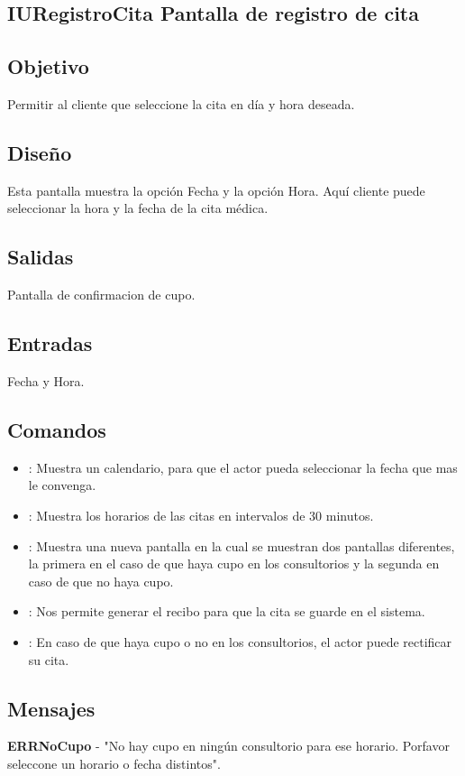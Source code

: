 \subsection{IURegistroCita Pantalla de registro de cita}

\subsection{Objetivo}
	Permitir al cliente que seleccione la cita en d\'ia y hora deseada.

\subsection{Diseño}
	Esta pantalla muestra la opci\'on Fecha y la opci\'on Hora. Aqu\'i cliente puede seleccionar la hora y la fecha de la cita m\'edica.


\subsection{Salidas}

	Pantalla de confirmacion de cupo.

\subsection{Entradas}
Fecha y Hora.

\subsection{Comandos}
\begin{itemize}
		\item {}: Muestra un calendario, para que el actor pueda seleccionar la fecha que mas le convenga.
		\item {}: Muestra los horarios de las citas en intervalos de 30 minutos.
		\item {}: Muestra una nueva pantalla en la cual se muestran dos pantallas diferentes, la primera en el caso de que haya cupo en los consultorios y la segunda en caso de que no haya cupo.


		\item {}: Nos permite generar el recibo para que la cita se guarde en el sistema.
		\item {}: En caso de que haya cupo o no en los consultorios, el actor puede rectificar su cita.
\end{itemize}

\subsection{Mensajes}
	\begin{Citemize}
		\item {\bf ERRNoCupo} - "No hay cupo en ning\'un consultorio para ese horario. Porfavor seleccone un horario o fecha distintos".
	\end{Citemize}

